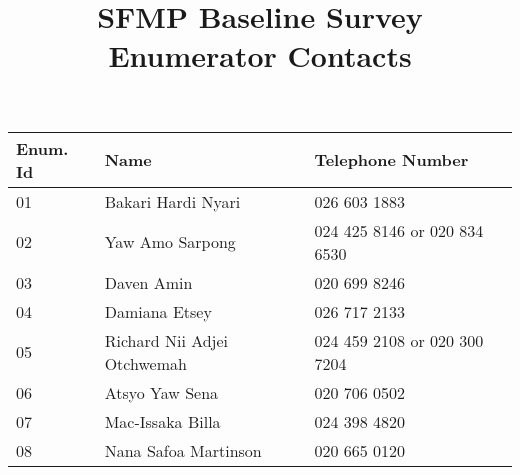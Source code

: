 \documentclass[a4paper,agenda,20pt]{extarticle}
\begin{document}
\title{SFMP Baseline Survey Enumerator Contacts}


\begin{tabularx}{\textwidth}{| l | X | X |} \hline
Enum. Id & Name  & Telephone Number \\ \hline \hline
01 &
Bakari Hardi Nyari &
026 603 1883 \\ \hline

02 &
Yaw Amo Sarpong &
024 425 8146 or 020 834 6530 \\ \hline

03 &
Daven Amin &
020 699 8246 \\ \hline

04 & 
Damiana Etsey &
026 717 2133 \\ \hline

05 & 
Richard Nii Adjei Otchwemah &
024 459 2108 or 020 300 7204 \\ \hline

06 & 
Atsyo Yaw Sena &
020 706 0502 \\ \hline

07 & 
Mac-Issaka Billa &
024 398 4820 \\ \hline

08 &
Nana Safoa Martinson &
020 665 0120 \\ \hline


\end{tabularx}
\end{document}
